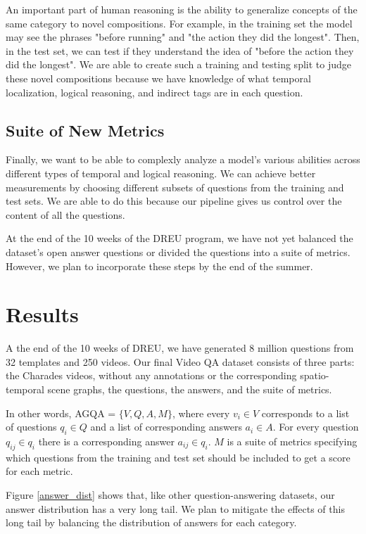 \documentclass[10pt,twocolumn,letterpaper]{article}
\begin{document}
    An important part of human reasoning is the ability to generalize concepts of the same category to novel compositions. For example, in the training set the model may see the phrases "before running" and "the action they did the longest". Then, in the test set, we can test if they understand the idea of "before the action they did the longest". We are able to create such a training and testing split to judge these novel compositions because we have knowledge of what temporal localization, logical reasoning, and indirect tags are in each question.

    \subsection{Suite of New Metrics}
    
    Finally, we want to be able to complexly analyze a model's various abilities across different types of temporal and logical reasoning. We can achieve better measurements by choosing different subsets of questions from the training and test sets. We are able to do this because our pipeline gives us control over the content of all the questions. 
    
    At the end of the 10 weeks of the DREU program, we have not yet balanced the dataset's open answer questions or divided the questions into a suite of metrics. However, we plan to incorporate these steps by the end of the summer. 

\section{Results}

A the end of the 10 weeks of DREU, we have generated 8 million questions from 32 templates and 250 videos. Our final Video QA dataset consists of three parts: the Charades videos, without any annotations or the corresponding spatio-temporal scene graphs, the questions, the answers, and the suite of metrics. 

In other words, AGQA = $\{ V, Q, A, M \}$, where every $v_i \in V$ corresponds to a list of questions $q_i  \in Q$ and a list of corresponding answers $a_i \in A$. For every question $q_{ij} \in q_i$ there is a corresponding answer $a_{ij} \in q_i$. $M$ is a suite of metrics specifying which questions from the training and test set should be included to get a score for each metric.


Figure \ref{answer_dist} shows that, like other question-answering datasets, our answer distribution has a very long tail. We plan to mitigate the effects of this long tail by balancing the distribution of answers for each category. 
\end{document}

